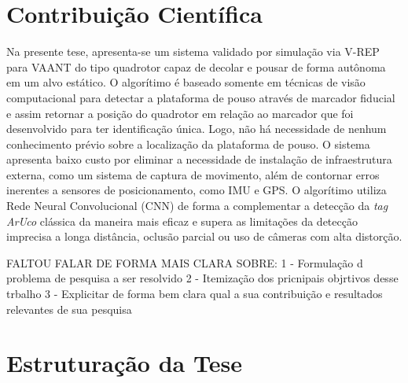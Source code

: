 \section{Contribuição Científica}
    
    Na presente tese, apresenta-se um sistema validado por simulação via V-REP para VAANT do tipo quadrotor capaz de decolar e pousar de forma autônoma em um alvo estático. O algorítimo é baseado somente em técnicas de visão computacional para detectar a plataforma de pouso através de marcador fiducial e assim retornar a posição do quadrotor em relação ao marcador que foi desenvolvido para ter identificação única. Logo, não há necessidade de nenhum conhecimento prévio sobre a localização da plataforma de pouso. O sistema apresenta baixo custo por eliminar a necessidade de instalação de infraestrutura externa, como um sistema de captura de movimento, além de contornar erros inerentes a sensores de posicionamento, como IMU e GPS. O algorítimo utiliza Rede Neural Convolucional (CNN) de forma a complementar a detecção da \textit{tag} \textit{ArUco} clássica da maneira mais eficaz e supera as limitações da detecção imprecisa a longa distância, oclusão parcial ou uso de câmeras com alta distorção.
    
    FALTOU FALAR DE FORMA MAIS CLARA SOBRE:
    1 - Formulação d problema de pesquisa a ser resolvido
    2 - Itemização dos pricnipais objrtivos desse trbalho
    3 - Explicitar de forma bem clara qual a sua contribuição e resultados relevantes de sua pesquisa




\section{Estruturação da Tese}

